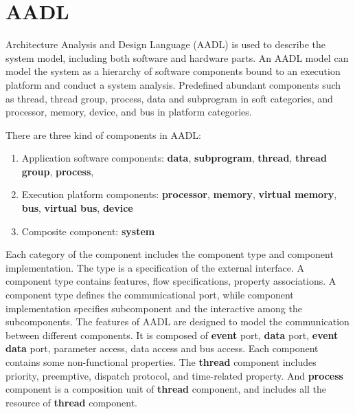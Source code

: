 
\section{AADL}

Architecture Analysis and Design Language (AADL) is used to describe the system model, including both software and hardware parts. An AADL model can model the system as a hierarchy of software components bound to an execution platform and conduct a system analysis. Predefined abundant components such as thread, thread group, process, data and subprogram in soft categories, and processor, memory, device, and bus in platform categories. 

There are three kind of components in AADL:
\begin{enumerate}
\item Application software components: \textbf{data}, \textbf{subprogram}, \textbf{thread}, \textbf{thread group}, \textbf{process}, 
\item Execution platform components: \textbf{processor}, \textbf{memory}, \textbf{virtual memory}, \textbf{bus}, \textbf{virtual bus}, \textbf{device}
\item Composite component: \textbf{system}
\end{enumerate}


Each category of the component includes the component type and component implementation. The type is a specification of the external interface. A component type contains features, flow specifications, property associations. A component type defines the communicational port, while component implementation specifies subcomponent and the interactive among the subcomponents. The features of AADL are designed to model the communication between different components. It is composed of \textbf{event} port, \textbf{data} port, \textbf{event data} port, parameter access, data access and bus access. Each component contains some non-functional properties. The \textbf{thread} component includes priority, preemptive, dispatch protocol, and time-related property. And \textbf{process} component is a composition unit of \textbf{thread} component, and includes all the resource of \textbf{thread} component. 





